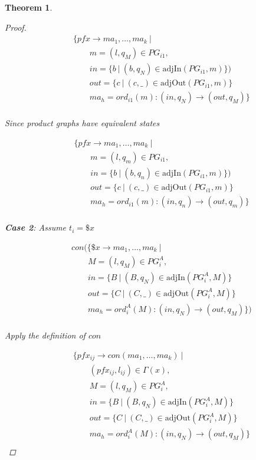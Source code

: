 \documentclass[twocolumn]{sig-alternate-10pt}
\newtheorem{thm}{Theorem}
\begin{document}
\begin{thm}
\begin{proof}
  \[ \begin{array}{l}
     ~~~~~~~~~ \{ pfx \rightarrow ma_1, \dots, ma_k ~\vert~ \\
     ~~~~~~~~~~~~~~~~~~ m = (l,q_M) \in PG_{i1}, \\
     ~~~~~~~~~~~~~~~~~~ in = \{ b ~\vert~ (b,q_N) \in \text{adjIn}(PG_{i1},m) \}) \\
     ~~~~~~~~~~~~~~~~~~ out = \{ c ~\vert~ (c,\_) \in \text{adjOut}(PG_{i1},m) \} \\
     ~~~~~~~~~~~~~~~~~~ ma_h = ord_{i1}(m) : (in,q_N) \rightarrow (out,q_M) \} \\
  \end{array} \]%

  Since product graphs have equivalent states

  \[ \begin{array}{l}
     ~~~~~~~~~ \{ pfx \rightarrow ma_1, \dots, ma_k ~\vert~ \\
     ~~~~~~~~~~~~~~~~~~ m = (l,q_m) \in PG_{i1}, \\
     ~~~~~~~~~~~~~~~~~~ in = \{ b ~\vert~ (b,q_n) \in \text{adjIn}(PG_{i1},m) \}) \\
     ~~~~~~~~~~~~~~~~~~ out = \{ c ~\vert~ (c,\_) \in \text{adjOut}(PG_{i1},m) \} \\
     ~~~~~~~~~~~~~~~~~~ ma_h = ord_{i1}(m) : (in,q_n) \rightarrow (out,q_m) \} \\
  \end{array} \]%

  \vspace{1em}
  \textbf{Case 2}: Assume $t_i = \$x$

  \[ \begin{array}{l}
     ~~~~~~~~~ con(\{ \$x \rightarrow ma_1, \dots, ma_k ~\vert~ \\
     ~~~~~~~~~~~~~~~~~~ M = (l,q_M) \in PG^A_i, \\
     ~~~~~~~~~~~~~~~~~~ in = \{ B ~\vert~ (B,q_N) \in \text{adjIn}(PG^A_i,M) \} \\
     ~~~~~~~~~~~~~~~~~~ out = \{ C ~\vert~ (C,\_) \in \text{adjOut}(PG^A_i,M) \} \\
     ~~~~~~~~~~~~~~~~~~ ma_h = ord^A_i(M) : (in,q_N) \rightarrow (out,q_M) \}) \\
  \end{array} \]%

  Apply the definition of $con$

  \[ \begin{array}{l}
     ~~~~~~~~~ \{ pfx_{ij} \rightarrow con(ma_1, \dots, ma_k) ~\vert~ \\
     ~~~~~~~~~~~~~~~~~~ (pfx_{ij}, l_{ij}) \in \Gamma(x), \\
     ~~~~~~~~~~~~~~~~~~ M = (l,q_M) \in PG^A_i, \\
     ~~~~~~~~~~~~~~~~~~ in = \{ B ~\vert~ (B,q_N) \in \text{adjIn}(PG^A_i,M) \} \\
     ~~~~~~~~~~~~~~~~~~ out = \{ C ~\vert~ (C,\_) \in \text{adjOut}(PG^A_i,M) \} \\
     ~~~~~~~~~~~~~~~~~~ ma_h = ord^A_i(M) : (in,q_N) \rightarrow (out,q_M) \} \\
  \end{array} \]%


\end{proof}
\end{thm}
\end{document}
